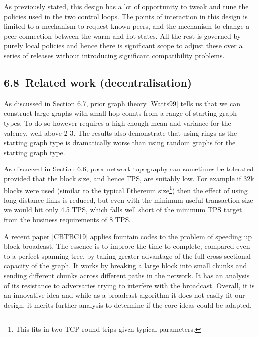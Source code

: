 \documentclass[11pt,a4paper]{article}
\begin{document}
As previously stated, this design has a lot of opportunity to tweak and
tune the policies used in the two control loops. The points of
interaction in this design is limited to a mechanism to request known
peers, and the mechanism to change a peer connection between the warm
and hot states. All the rest is governed by purely local policies and
hence there is significant scope to adjust these over a series of
releases without introducing significant compatibility problems.

\hypertarget{related-work-decentralisation}{%
\subsection{​6.8​~Related work
(decentralisation)}\label{related-work-decentralisation}}


As discussed in \protect\hyperlink{decentralisation-design}{{Section
6.7}}, prior graph theory {[}Watts99{]} tells us that we can construct
large graphs with small hop counts from a range of starting graph types.
To do so however requires a high enough mean and variance for the
valency, well above 2-3. The results also demonstrate that using rings
as the starting graph type is dramatically worse than using random
graphs for the starting graph type.

As discussed in
\protect\hyperlink{decentralisation-constraints}{{Section 6.6}}, poor
network topography can sometimes be tolerated provided that the block
size, and hence TPS, are suitably low. For example if 32k blocks were
used (similar to the typical Ethereum size\footnote{This fits in two TCP
  round trips given typical parameters.}) then the effect of using long
distance links is reduced, but even with the minimum useful transaction
size we would hit only 4.5 TPS, which falls well short of the minimum
TPS target from the business requirements of 8 TPS.

A recent paper {[}CBTBC19{]} applies fountain codes to the problem of
speeding up block broadcast. The essence is to improve the time to
complete, compared even to a perfect spanning tree, by taking greater
advantage of the full cross-sectional capacity of the graph. It works by
breaking a large block into small chunks and sending different chunks
across different paths in the network. It has an analysis of its
resistance to adversaries trying to interfere with the broadcast.
Overall, it is an innovative idea and while as a broadcast algorithm it
does not easily fit our design, it merits further analysis to determine
if the core ideas could be adapted.
\end{document}
